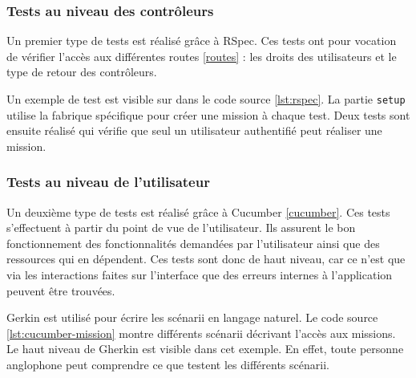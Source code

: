 \subsubsection{Tests au niveau des contrôleurs}
Un premier type de tests est réalisé grâce à RSpec. Ces tests ont pour vocation de vérifier l'accès aux différentes routes \ref{routes} : les droits des utilisateurs et le type de retour des contrôleurs.

Un exemple de test est visible sur dans le code source \ref{lst:rspec}. La partie \texttt{setup} utilise la fabrique spécifique pour créer une mission à chaque test. Deux tests sont ensuite réalisé qui vérifie que seul un utilisateur authentifié peut réaliser une mission.

\begin{figure}

\end{figure}

\subsubsection{Tests au niveau de l'utilisateur}
Un deuxième type de tests est réalisé grâce à Cucumber \ref{cucumber}. Ces tests s'effectuent à partir du point de vue de l'utilisateur. Ils assurent le bon fonctionnement des fonctionnalités demandées par l'utilisateur ainsi que des ressources qui en dépendent. Ces tests sont donc de haut niveau, car ce n'est que via les interactions faites sur l'interface que des erreurs internes à l'application peuvent être trouvées.

\begin{figure}

\end{figure}

\begin{figure}

\end{figure}

Gerkin est utilisé pour écrire les scénarii en langage naturel. 
Le code source \ref{lst:cucumber-mission} montre différents scénarii décrivant l'accès aux missions. Le haut niveau de Gherkin est visible dans cet exemple. En effet, toute personne anglophone peut comprendre ce que testent les différents scénarii. 

